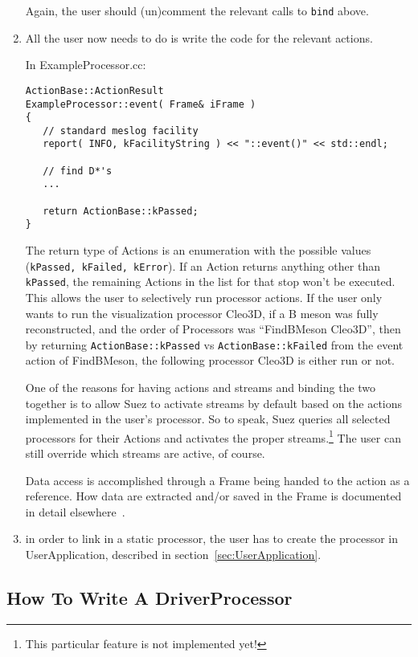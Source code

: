 \documentclass[12pt]{article}
\begin{document}
\begin{enumerate}
Again, the user should (un)comment the relevant calls to \texttt{bind}
above.

\item All the user now needs to do is write the code for the relevant
actions.

\noindent In ExampleProcessor.cc:
\begin{verbatim}
ActionBase::ActionResult
ExampleProcessor::event( Frame& iFrame )
{
   // standard meslog facility
   report( INFO, kFacilityString ) << "::event()" << std::endl;

   // find D*'s
   ...

   return ActionBase::kPassed;
}
\end{verbatim}

The return type of Actions is an enumeration with the possible values
(\texttt{kPassed, kFailed, kError}). If an Action returns anything other
than \texttt{kPassed}, the remaining Actions in the list for that stop
won't be executed. This allows the user to selectively run processor
actions. If the user only wants to run the visualization processor
Cleo3D, if a B meson was fully reconstructed, and the order of
Processors was ``FindBMeson Cleo3D'', then by returning
\texttt{ActionBase::kPassed} vs \texttt{ActionBase::kFailed} from the
event action of FindBMeson, the following processor Cleo3D is either run
or not.

One of the reasons for having actions and streams and binding the two
together is to allow Suez to activate streams by default based on the
actions implemented in the user's processor. So to speak, Suez queries
all selected processors for their Actions and activates the proper
streams.\footnote{This particular feature is not implemented yet!}  The
user can still override which streams are active, of course.

Data access is accomplished through a Frame being handed to the action
as a reference. How data are extracted and/or saved in the Frame is
documented in detail elsewhere~\cite{Delivery}.

\item in order to link in a static processor, the user has to create the
processor in UserApplication, described in
section~\ref{sec:UserApplication}.

\end{enumerate}


\subsection{How To Write A DriverProcessor }
\label{sec:HowToWriteADriverProcessor}
\end{document}
